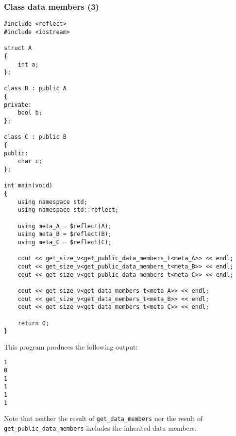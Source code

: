 \subsubsection{Class data members (3)}

\begin{verbatim}
#include <reflect>
#include <iostream>

struct A
{
	int a;
};

class B : public A
{
private:
	bool b;
};

class C : public B
{
public:
	char c;
};

int main(void)
{
	using namespace std;
	using namespace std::reflect;

	using meta_A = $reflect(A);
	using meta_B = $reflect(B);
	using meta_C = $reflect(C);

	cout << get_size_v<get_public_data_members_t<meta_A>> << endl;
	cout << get_size_v<get_public_data_members_t<meta_B>> << endl;
	cout << get_size_v<get_public_data_members_t<meta_C>> << endl;

	cout << get_size_v<get_data_members_t<meta_A>> << endl;
	cout << get_size_v<get_data_members_t<meta_B>> << endl;
	cout << get_size_v<get_data_members_t<meta_C>> << endl;

	return 0;
}
\end{verbatim}

This program produces the following output:

\begin{verbatim}
1
0
1
1
1
1
\end{verbatim}

Note that neither the result of \texttt{get\_data\_members} nor the result of
\texttt{get\_public\_data\_members} includes the inherited data members.
